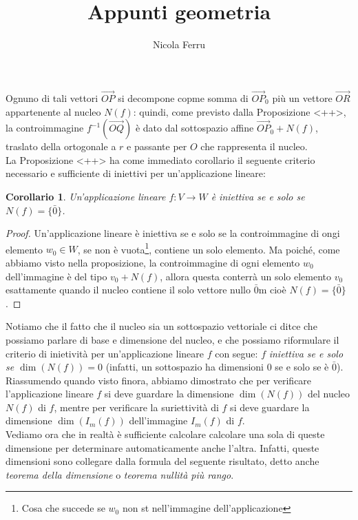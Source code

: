 \documentclass{book}
\title{Appunti geometria}
\author{Nicola Ferru}
\newtheorem{corollario}{Corollario}
\begin{document}
\maketitle
\tableofcontents
\listoftables
\listoffigures






Ognuno di tali vettori $\vec{OP}$ si decompone copme somma di $\vec{OP}_0$ più un vettore
$\vec{OR}$ appartenente al nucleo $N(f)$: quindi, come previsto dalla Proposizione <++>, la
controimmagine $f^{-1}(\vec{OQ})$ è dato dal sottospazio affine $\vec{OP}_0+N(f)$, traslato
della ortogonale a $r$ e passante per $O$ che rappresenta il nucleo.\\
La Proposizione <++> ha come immediato corollario il seguente criterio necessario e sufficiente di iniettivi per
un'applicazione lineare:
\begin{corollario}
  Un'applicazione lineare $f:V\to W$ è iniettiva se e solo se $N(f)=\{\bar{0}\}$. 
\end{corollario}
\begin{proof}
  Un'applicazione lineare è iniettiva se e solo se la controimmagine di ongi elemento $w_0\in W$, se non è
  vuota\footnote{Cosa che succede se $w_0$ non st nell'immagine dell'applicazione}, contiene un solo elemento.
  Ma poiché, come abbiamo visto nella proposizione, la controimmagine di ogni elemento $w_0$ dell'immagine è del
  tipo $v_0+N(f)$, allora questa conterrà un solo elemento $v_0$ esattamente quando il nucleo contiene il solo
  vettore nullo $\bar{0}$m cioè $N(f)=\{\bar{0}\}$.
\end{proof}
Notiamo che il fatto che il nucleo sia un sottospazio vettoriale ci ditce che possiamo parlare di base e
dimensione del nucleo, e che possiamo riformulare il criterio di inietività per un'applicazione lineare $f$ con
segue: $f$ {\it iniettiva se e solo se $\dim(N(f))=0$} (infatti, un sottospazio ha dimensioni $0$ se e solo se è
$\bar{0}$). Riassumendo quando visto finora, abbiamo dimostrato che per verificare l'applicazione lineare $f$ si
deve guardare la dimensione $\dim (N(f))$ del nucleo $N(f)$ di $f$, mentre per verificare la suriettività di $f$
si deve guardare la dimensione $\dim(I_m(f))$ dell'immagine $I_m(f)$ di $f$.\\
Vediamo ora che in realtà è sufficiente calcolare calcolare una sola di queste dimensione per determinare
automaticamente anche l'altra. Infatti, queste dimensioni sono collegare dalla formula del seguente risultato,
detto anche \textit{teorema della dimensione} o \textit{teorema nullità più rango}.
\end{document}
